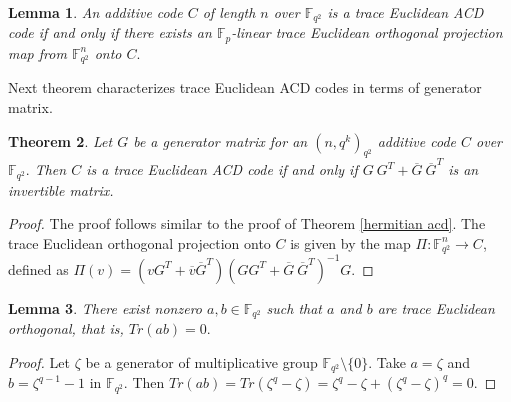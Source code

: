 \documentclass[sn-mathphys-num]{sn-jnl}%
\theoremstyle{thmstyleone}%
\newtheorem{theorem}{Theorem}%
\newtheorem{lemma}[theorem]{Lemma}
\theoremstyle{thmstyletwo}%
\theoremstyle{thmstylethree}%
\begin{document}
\begin{lemma}\label{iffprojectio euclidean}
	An additive code $C$ of length $n$ over $\mathbb{F}_{q^2}$ is a trace Euclidean ACD code  if and only if there exists an $\mathbb{F}_p$-linear trace Euclidean orthogonal projection map from $\mathbb{F}_{q^2}^n$ onto $C.$
\end{lemma}

Next theorem characterizes trace Euclidean ACD codes in terms of generator matrix.
\begin{theorem}\label{euclidean acd}
	Let $G$ be a generator matrix for an $(n,q^k)_{q^2}$ additive code $C$ over $\mathbb{F}_{q^2}.$ Then $C$ is a trace Euclidean ACD code if and only if $G\ G^T+\overline{G} \ \overline{G}^T$ is an  invertible matrix.
\end{theorem}
\begin{proof}
	The proof follows similar to the proof of Theorem \ref{hermitian acd}.  The trace Euclidean orthogonal projection onto $C$ is given by the map $\Pi: \mathbb{F}_{q^2}^n \to C$, defined as
	$\Pi(v)=(v G^T+\overline{v}\overline{G}^T)(GG^T+\overline{G}\ \overline{G}^T)^{-1}G.$
\end{proof}

\begin{lemma}
	There exist nonzero $ a,b\in \mathbb{F}_{q^2}$ such that $a$ and $b$ are trace Euclidean orthogonal, that is, $Tr(ab)=0.$
\end{lemma}
\begin{proof}
	Let $\zeta$ be a generator of multiplicative group $\mathbb{F}_{q^2}\setminus \{0\}$. Take $a=\zeta$ and $b=\zeta^{q-1}-1$ in $\mathbb{F}_{q^2}.$  Then $Tr(ab)=Tr(\zeta^q-\zeta)=\zeta^q-\zeta +(\zeta^q-\zeta)^q=0.$ 
\end{proof}
\end{document}
